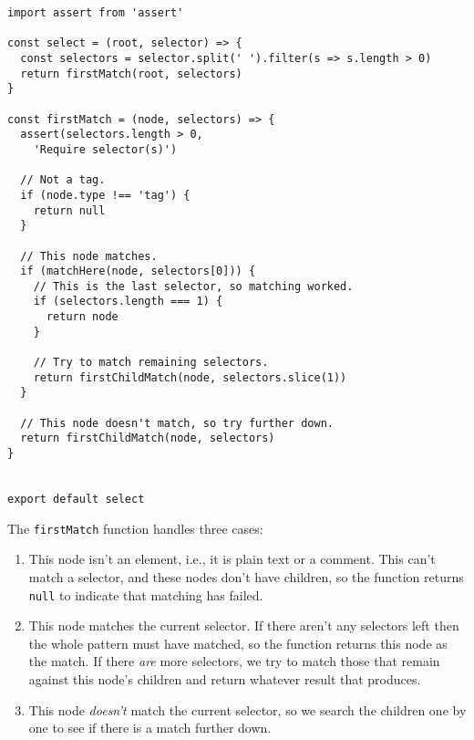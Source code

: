 \documentclass[krantzl]{krantz}
\begin{document}
\begin{lstlisting}[frame=tblr]
import assert from 'assert'

const select = (root, selector) => {
  const selectors = selector.split(' ').filter(s => s.length > 0)
  return firstMatch(root, selectors)
}

const firstMatch = (node, selectors) => {
  assert(selectors.length > 0,
    'Require selector(s)')

  // Not a tag.
  if (node.type !== 'tag') {
    return null
  }

  // This node matches.
  if (matchHere(node, selectors[0])) {
    // This is the last selector, so matching worked.
    if (selectors.length === 1) {
      return node
    }

    // Try to match remaining selectors.
    return firstChildMatch(node, selectors.slice(1))
  }

  // This node doesn't match, so try further down.
  return firstChildMatch(node, selectors)
}


export default select
\end{lstlisting}



The \texttt{firstMatch} function handles three cases:

\begin{enumerate}

\item 

This node isn’t an element, i.e., it is plain text or a comment.
    This can’t match a selector, and these nodes don’t have children,
    so the function returns \texttt{null} to indicate that matching has failed.



\item 

This node matches the current selector.
    If there aren’t any selectors left then the whole pattern must have matched,
    so the function returns this node as the match.
    If there \emph{are} more selectors,
    we try to match those that remain against this node’s children
    and return whatever result that produces.



\item 

This node \emph{doesn’t} match the current selector,
    so we search the children one by one to see if there is a match further down.



\end{enumerate}
\end{document}
